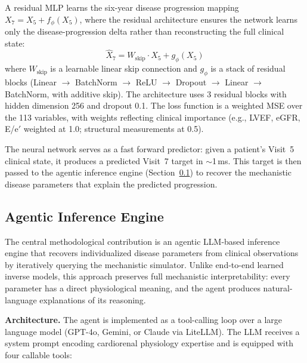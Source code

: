 \documentclass[pmlr]{jmlr}
\begin{document}
A residual MLP learns the six-year disease progression mapping $X_7 = X_5 + f_\phi(X_5)$, where the residual architecture ensures the network learns only the disease-progression delta rather than reconstructing the full clinical state:
\begin{equation}
\hat{X}_7 = W_{\text{skip}} \cdot X_5 + g_\phi(X_5)
\label{eq:residual}
\end{equation}
where $W_{\text{skip}}$ is a learnable linear skip connection and $g_\phi$ is a stack of residual blocks (Linear $\to$ BatchNorm $\to$ ReLU $\to$ Dropout $\to$ Linear $\to$ BatchNorm, with additive skip). The architecture uses 3 residual blocks with hidden dimension 256 and dropout 0.1. The loss function is a weighted MSE over the 113 variables, with weights reflecting clinical importance (e.g., LVEF, eGFR, E/e$'$ weighted at 1.0; structural measurements at 0.5).

The neural network serves as a fast forward predictor: given a patient's Visit~5 clinical state, it produces a predicted Visit~7 target in $\sim$1\,ms. This target is then passed to the agentic inference engine (Section~\ref{sec:agent}) to recover the mechanistic disease parameters that explain the predicted progression.

\subsection{Agentic Inference Engine}
\label{sec:agent}

The central methodological contribution is an agentic LLM-based inference engine that recovers individualized disease parameters from clinical observations by iteratively querying the mechanistic simulator. Unlike end-to-end learned inverse models, this approach preserves full mechanistic interpretability: every parameter has a direct physiological meaning, and the agent produces natural-language explanations of its reasoning.

\textbf{Architecture.} The agent is implemented as a tool-calling loop over a large language model (GPT-4o, Gemini, or Claude via LiteLLM). The LLM receives a system prompt encoding cardiorenal physiology expertise and is equipped with four callable tools:
\end{document}
